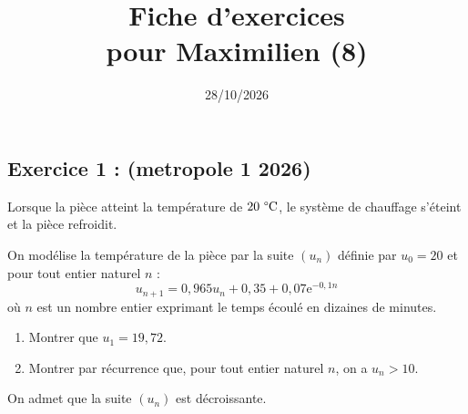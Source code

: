 \documentclass[12pt,a4paper]{article}
\title{Fiche d'exercices \\ pour Maximilien (8)}
\date{28/10/2026}
\author{}
\begin{document}
\maketitle


\subsection*{Exercice 1 : (metropole 1 2026)}
Lorsque la pièce atteint la température de $20\text{ \textdegree{}C}$, le système de chauffage s'éteint et la pièce refroidit.

On modélise la température de la pièce par la suite $(u_n)$ définie par $u_0 = 20$ et pour tout entier naturel $n$ :
$$u_{n+1} = 0,965u_n + 0,35 + 0,07\text{e}^{-0,1n}$$
où $n$ est un nombre entier exprimant le temps écoulé en dizaines de minutes.

\begin{enumerate}
    \item Montrer que $u_1 = 19,72$.
    \item Montrer par récurrence que, pour tout entier naturel $n$, on a $u_n > 10$.
\end{enumerate}

On admet que la suite $(u_n)$ est décroissante.
\end{document}
